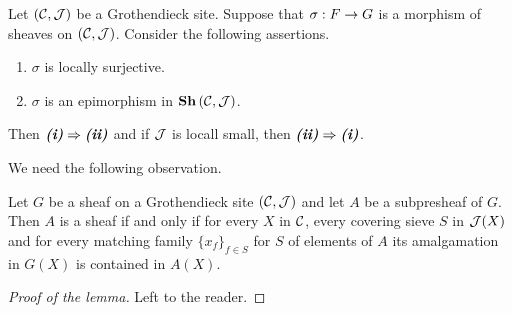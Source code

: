 \begin{theorem}\label{theorem:epimorphismsinthecategoryofsheaves}
Let $({\mathcal C},{\mathcal J})$ be a Grothendieck site. Suppose that $\sigma:F\rightarrow G$ is a morphism of sheaves on $\left({\mathcal C},{\mathcal J}\right)$. Consider the following assertions.
\begin{enumerate}[label=\emph{\textbf{(\roman*)}}, leftmargin=1.5em]
\item $\sigma$ is locally surjective.
\item $\sigma$ is an epimorphism in $\mathbf{Sh}\left({\mathcal C},{\mathcal J}\right)$.
\end{enumerate}
Then $\emph{\textbf{(i)}}\Rightarrow \emph{\textbf{(ii)}}$ and if ${\mathcal J}$ is locall small, then $\emph{\textbf{(ii)}}\Rightarrow \emph{\textbf{(i)}}$.
\end{theorem}
\noindent
We need the following observation.

\begin{lemma}\label{lemma:sheafcriterionforsubpresheaves}
Let $G$ be a sheaf on a Grothendieck site $({\mathcal C},{\mathcal J})$ and let $A$ be a subpresheaf of $G$. Then $A$ is a sheaf if and only if for every $X$ in ${\mathcal C}$, every covering sieve $S$ in ${\mathcal J}(X)$ and for every matching family $\{x_f\}_{f\in S}$ for $S$ of elements of $A$ its amalgamation in $G(X)$ is contained in $A(X)$.
\end{lemma}
\begin{proof}[Proof of the lemma]
Left to the reader.
\end{proof}

